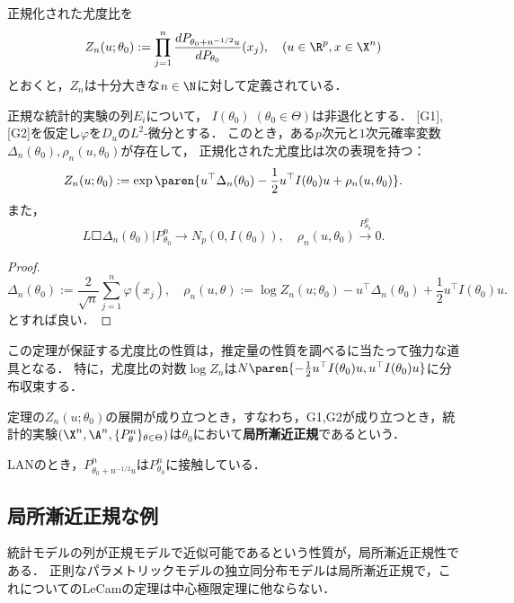 \documentclass[uplatex,dvipdfmx]{jsreport}
\begin{document}
\begin{notation}
    正規化された尤度比を
    \[Z_n(u;\theta_0):=\prod^n_{j=1}\frac{dP_{\theta_0+n^{-1/2}u}}{dP_{\theta_0}}(x_j),\quad(u\in\R^p,x\in\X^n)\]
    とおくと，$Z_n$は十分大きな$n\in\N$に対して定義されている．
\end{notation}

\begin{theorem}[LeCam]
    正規な統計的実験の列$E_i$について，
    $I(\theta_0)\;(\theta_0\in\Theta)$は非退化とする．
    [G1],[G2]を仮定し$\varphi$を$D_u$の$L^2$-微分とする．
    このとき，ある$p$次元と$1$次元確率変数$\Delta_n(\theta_0),\rho_n(u,\theta_0)$が存在して，
    正規化された尤度比は次の表現を持つ：
    \[Z_n(u;\theta_0):=\exp\paren{u^\top\Delta_n(\theta_0)-\frac{1}{2}u^\top I(\theta_0)u+\rho_n(u,\theta_0)}.\]
    また，
    \[L\Square{\Delta_n(\theta_0)|P^n_{\theta_0}}\to N_p(0,I(\theta_0)),\quad\rho_n(u,\theta_0)\xrightarrow{P^n_{\theta_0}}0.\]
\end{theorem}
\begin{proof}
    \[\Delta_n(\theta_0):=\frac{2}{\sqrt{n}}\sum^n_{j=1}\varphi(x_j),\quad\rho_n(u,\theta):=\log Z_n(u;\theta_0)-u^\top\Delta_n(\theta_0)+\frac{1}{2}u^\top I(\theta_0)u.\]
    とすれば良い．
\end{proof}
\begin{remarks}
    この定理が保証する尤度比の性質は，推定量の性質を調べるに当たって強力な道具となる．
    特に，尤度比の対数$\log Z_n$は$N\paren{-\frac{1}{2}u^\top I(\theta_0)u,u^\top I(\theta_0)u}$に分布収束する．
\end{remarks}

\begin{definition}
    定理の$Z_n(u;\theta_0)$の展開が成り立つとき，すなわち，G1,G2が成り立つとき，統計的実験$(\X^n,\A^n,\{P^n_\theta\}_{\theta\in\Theta})$は$\theta_0$において\textbf{局所漸近正規}であるという．
\end{definition}
\begin{remarks}
    LANのとき，$P^n_{\theta_0+n^{-1/2}u}$は$P^n_{\theta_0}$に接触している．
\end{remarks}

\subsection{局所漸近正規な例}

\begin{tcolorbox}[colframe=ForestGreen, colback=ForestGreen!10!white,breakable,colbacktitle=ForestGreen!40!white,coltitle=black,fonttitle=\bfseries\sffamily,
title=]
    統計モデルの列が正規モデルで近似可能であるという性質が，局所漸近正規性である．
    正則なパラメトリックモデルの独立同分布モデルは局所漸近正規で，これについてのLeCamの定理は中心極限定理に他ならない．
\end{tcolorbox}
\end{document}
